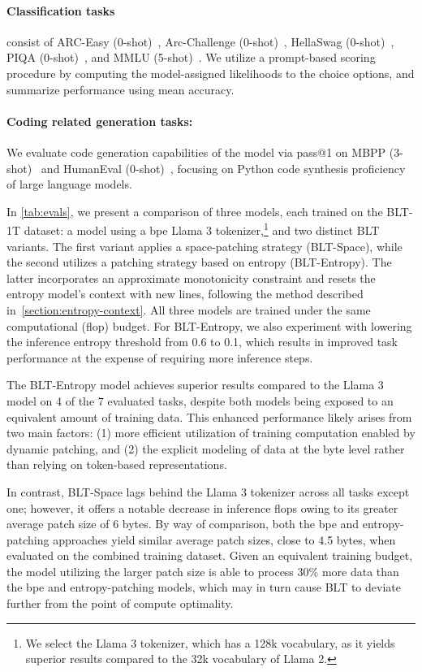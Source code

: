 \paragraph{Classification tasks} consist of ARC-Easy (0-shot)~\citep{Eval_ARC}, Arc-Challenge (0-shot)~\citep{Eval_ARC}, HellaSwag (0-shot)~\citep{Eval_hellaswag}, PIQA (0-shot)~\citep{Eval_piqa}, and MMLU (5-shot)~\citep{hendrycks2020measuring}. We utilize a prompt-based scoring procedure by computing the model-assigned likelihoods to the choice options, and summarize performance using mean accuracy.
\paragraph{Coding related generation tasks:} We evaluate code generation capabilities of the model via pass@1 on MBPP (3-shot)~\citep{Eval_MBPP} and HumanEval (0-shot)~\citep{Eval_HumanEval}, focusing on Python code synthesis proficiency of large language models.

In \autoref{tab:evals}, we present a comparison of three models, each trained on the {\textsc BLT}-1T dataset: a model using a bpe Llama 3 tokenizer,\footnote{We select the Llama 3 tokenizer, which has a 128k vocabulary, as it yields superior results compared to the 32k vocabulary of Llama 2.} and two distinct {\textsc BLT} variants. The first variant applies a space-patching strategy ({\textsc BLT}-Space), while the second utilizes a patching strategy based on entropy ({\textsc BLT}-Entropy). The latter incorporates an approximate monotonicity constraint and resets the entropy model's context with new lines, following the method described in~\autoref{section:entropy-context}. All three models are trained under the same computational (flop) budget. For {\textsc BLT}-Entropy, we also experiment with lowering the inference entropy threshold from 0.6 to 0.1, which results in improved task performance at the expense of requiring more inference steps.

The {\textsc BLT}-Entropy model achieves superior results compared to the Llama 3 model on 4 of the 7 evaluated tasks, despite both models being exposed to an equivalent amount of training data. This enhanced performance likely arises from two main factors: (1) more efficient utilization of training computation enabled by dynamic patching, and (2) the explicit modeling of data at the byte level rather than relying on token-based representations.

In contrast, {\textsc BLT}-Space lags behind the Llama 3 tokenizer across all tasks except one; however, it offers a notable decrease in inference flops owing to its greater average patch size of 6 bytes. By way of comparison, both the bpe and entropy-patching approaches yield similar average patch sizes, close to 4.5 bytes, when evaluated on the combined training dataset. Given an equivalent training budget, the model utilizing the larger patch size is able to process 30\% more data than the bpe and entropy-patching models, which may in turn cause {\textsc BLT} to deviate further from the point of compute optimality.

